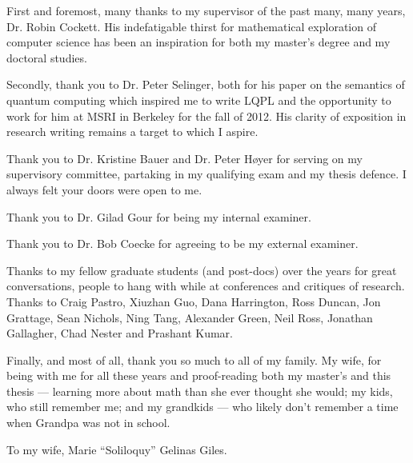 \documentclass{ucalgthes1}
\begin{document}
\newpage
{}
{}

First and foremost, many thanks to my supervisor of the past many, many years, Dr. Robin
Cockett. His indefatigable thirst for mathematical exploration of computer science has been an
inspiration for both my master's degree and my doctoral studies.

Secondly, thank you to Dr. Peter Selinger, both for his paper on the semantics of quantum computing
which inspired me to write LQPL and the opportunity to work for him at MSRI in Berkeley for the fall
of 2012. His clarity of exposition in research writing remains a target to which I aspire.

Thank you to Dr. Kristine Bauer and Dr. Peter Høyer for serving on my supervisory committee,
partaking in my qualifying exam and my thesis defence. I always felt your doors were open to me.

Thank you to Dr. Gilad Gour for being my internal examiner.

Thank you to Dr. Bob Coecke for agreeing to be my external examiner.

Thanks to my fellow graduate students (and post-docs) over the years for great conversations, people
to hang with while at conferences and critiques of research. Thanks to Craig Pastro, Xiuzhan Guo,
Dana Harrington, Ross Duncan, Jon Grattage, Sean Nichols, Ning Tang, Alexander Green, Neil Ross,
Jonathan Gallagher, Chad Nester and Prashant Kumar.

Finally, and most of all, thank you so much to all of my family. My wife, for being with me for all
these years and proof-reading both my master's and this thesis --- learning more about math than she
ever thought she would; my kids, who still remember me; and my grandkids --- who likely don't remember a time
when Grandpa was not in school.
\newpage
{}
{}
\vspace{3in}
\begin{flushright}
To my wife, Marie ``Soliloquy'' Gelinas Giles.
\end{flushright}


\begin{singlespace}
\newpage
{}
\tableofcontents
\pagestyle{plain}
\newpage
{}
\listoftables
\pagestyle{plain}
\newpage
{}
\listoffigures
\pagestyle{plain}
\clearpage
\clearpage          %
\end{singlespace}
\newpage
{}
\end{document}

